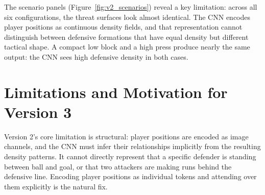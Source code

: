 The scenario panels (Figure~\ref{fig:v2_scenarios}) reveal a key limitation: across all six configurations, the threat surfaces look almost identical. The CNN encodes player positions as continuous density fields, and that representation cannot distinguish between defensive formations that have equal density but different tactical shape. A compact low block and a high press produce nearly the same output: the CNN sees high defensive density in both cases.

\section{Limitations and Motivation for Version 3}

Version 2's core limitation is structural: player positions are encoded as image channels, and the CNN must infer their relationships implicitly from the resulting density patterns. It cannot directly represent that a specific defender is standing between ball and goal, or that two attackers are making runs behind the defensive line. Encoding player positions as individual tokens and attending over them explicitly is the natural fix.
